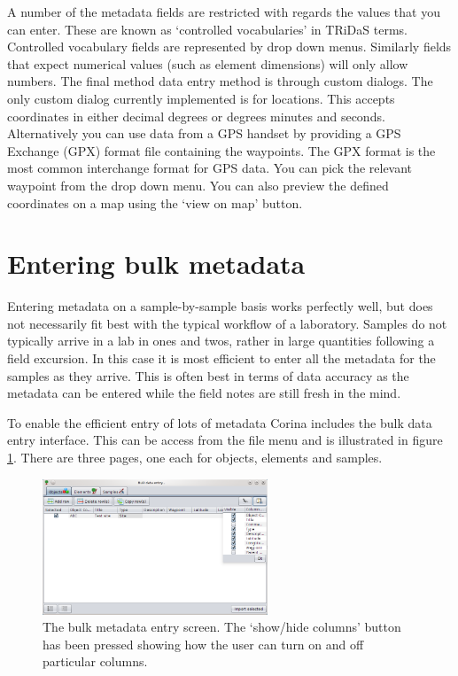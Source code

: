A number of the metadata fields are restricted with regards the values that you can enter.  These are known as `controlled vocabularies' in TRiDaS terms.  Controlled vocabulary fields are represented by drop down menus.  Similarly fields that expect numerical values (such as element dimensions) will only allow numbers.  The final method data entry method is through custom dialogs.  The only custom dialog currently implemented is for locations.  This accepts coordinates in either decimal degrees or degrees minutes and seconds.  Alternatively you can use data from a GPS handset by providing a GPS Exchange (GPX) format file containing the waypoints. The GPX format is the most common interchange format for GPS data. You can pick the relevant waypoint from the drop down menu.  You can also preview the defined coordinates on a map using the `view on map' button. 



\section{Entering bulk metadata}
\label{txt:bulkentry}
Entering metadata on a sample-by-sample basis works perfectly well, but does not necessarily fit best with the typical workflow of a laboratory.  Samples do not typically arrive in a lab in ones and twos, rather in large quantities following a field excursion.  In this case it is most efficient to enter all the metadata for the samples as they arrive.  This is often best in terms of data accuracy as the metadata can be entered while the field notes are still fresh in the mind.

To enable the efficient entry of lots of metadata Corina includes the bulk data entry interface.  This can be access from the file menu and is illustrated in figure \ref{fig:bulkentry}.  There are three pages, one each for objects, elements and samples.

\begin{figure}
\centering
\includegraphics[width=0.6\textwidth]{Images/bulkentry.png}
\caption{The bulk metadata entry screen.  The `show/hide columns' button has been pressed showing how the user can turn on and off particular columns.} 
\label{fig:bulkentry}
\end{figure}

